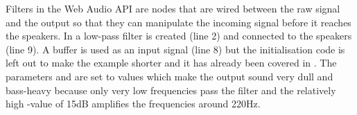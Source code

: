Filters in the Web Audio API are nodes that are wired between the raw signal and the output so that they can manipulate the incoming signal before it reaches the speakers. In  a low-pass filter is created (line 2) and connected to the speakers (line 9). A buffer is used as an input signal (line 8) but the initialisation code is left out to make the example shorter and it has already been covered in . The parameters  and  are set to values which make the output sound very dull and bass-heavy because only very low frequencies pass the filter and the relatively high -value of 15dB amplifies the frequencies around 220Hz.